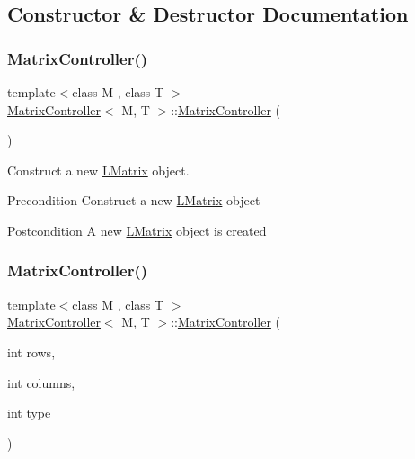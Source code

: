 \subsection{Constructor \& Destructor Documentation}
\mbox{\label{class_matrix_controller_ad3e161e9dfa785fc9e9007b12d79a834}} 
\subsubsection{\texorpdfstring{MatrixController()}{MatrixController()}\hspace{0.1cm}{\footnotesize\ttfamily [1/3]}}
{\footnotesize\ttfamily template$<$class M , class T $>$ \\
\mbox{\hyperlink{class_matrix_controller}{Matrix\+Controller}}$<$ M, T $>$\+::\mbox{\hyperlink{class_matrix_controller}{Matrix\+Controller}} (\begin{DoxyParamCaption}{ }\end{DoxyParamCaption})}



Construct a new \mbox{\hyperlink{class_l_matrix}{L\+Matrix}} object. 

\begin{DoxyPrecond}{Precondition}
Construct a new \mbox{\hyperlink{class_l_matrix}{L\+Matrix}} object 
\end{DoxyPrecond}
\begin{DoxyPostcond}{Postcondition}
A new \mbox{\hyperlink{class_l_matrix}{L\+Matrix}} object is created 
\end{DoxyPostcond}
\mbox{\label{class_matrix_controller_a25d13774e48d029ac6095c9b7637cb23}} 
\subsubsection{\texorpdfstring{MatrixController()}{MatrixController()}\hspace{0.1cm}{\footnotesize\ttfamily [2/3]}}
{\footnotesize\ttfamily template$<$class M , class T $>$ \\
\mbox{\hyperlink{class_matrix_controller}{Matrix\+Controller}}$<$ M, T $>$\+::\mbox{\hyperlink{class_matrix_controller}{Matrix\+Controller}} (\begin{DoxyParamCaption}\item[{int}]{rows,  }\item[{int}]{columns,  }\item[{int}]{type }\end{DoxyParamCaption})}



